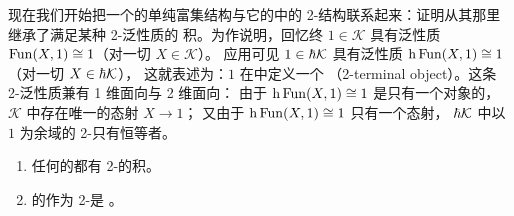 现在我们开始把一个\trInfinityCosmos{}的单纯富集结构与它的\trHomotopyTwoCategory{}中的
2-\trCategory{}结构联系起来：证明\trHomotopyTwoCategory{}从其\trInfinityCosmos{}那里继承了满足某种 2-\trCategory{}泛性质的
积。为作说明，回忆终\trInfinityCategory{} $1\in\mathcal{K}$ 具有泛性质
$\operatorname{Fun}(X,1)\cong 1$（对一切 $X\in\mathcal{K}$）。
应用\trHomotopyCategory\trFunctor{}可见 $1\in\hbar \mathcal{K}$ 具有泛性质
$\mathrm{h}\operatorname{Fun}(X,1)\cong 1$（对一切 $X\in\hbar \mathcal{K}$），
这就表述为：\trInfinityCategory $1$ 在\trHomotopyTwoCategory{}中定义一个\textbf{\trTwoTerminalObject}
（2-terminal object）。这条 2-\trCategory{}泛性质兼有 1 维面向与 2 维面向：
由于 $\mathrm{h}\operatorname{Fun}(X,1)\cong 1$ 是只有一个对象的\trCategory{}，
$\mathcal{K}$ 中存在唯一的态射 $X\to 1$；
又由于 $\mathrm{h}\operatorname{Fun}(X,1)\cong 1$ 只有一个态射，
$\hbar \mathcal{K}$ 中以 $1$ 为余域的 2-\trCell{}只有恒等者。

\begin{proposition}[笛卡尔封闭]\label{prop:cartesian-closure}
\begin{enumerate}[label=(\roman*)]
\item 任何\trInfinityCosmos{}的\trHomotopyTwoCategory{}都有 2-\trCategory{}的积。
\item \trCartesianClosed\trInfinityCosmos{}的\trHomotopyTwoCategory{}作为 2-\trCategory{}是%
\trCartesianClosed{}。
\end{enumerate}
\end{proposition}

